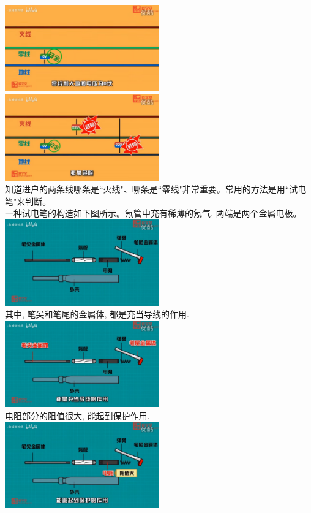 \documentclass[UTF8]{ctexart}
\begin{document}
	\includegraphics[width=0.5\textwidth]{img/0064.png} 
\includegraphics[width=0.5\textwidth]{img/0065.png}  \\

知道进户的两条线哪条是``火线"、哪条是``零线"非常重要。常用的方法是用``试电笔"来判断。 \\
一种试电笔的构造如下图所示。氖管中充有稀薄的氖气, 两端是两个金属电极。 \\
\includegraphics[width=0.5\textwidth]{img/0066.png}  \\

其中, 笔尖和笔尾的金属体, 都是充当导线的作用. \\
\includegraphics[width=0.5\textwidth]{img/0067.png}  \\

电阻部分的阻值很大, 能起到保护作用. \\
\includegraphics[width=0.5\textwidth]{img/0068.png}  \\
\end{document}
